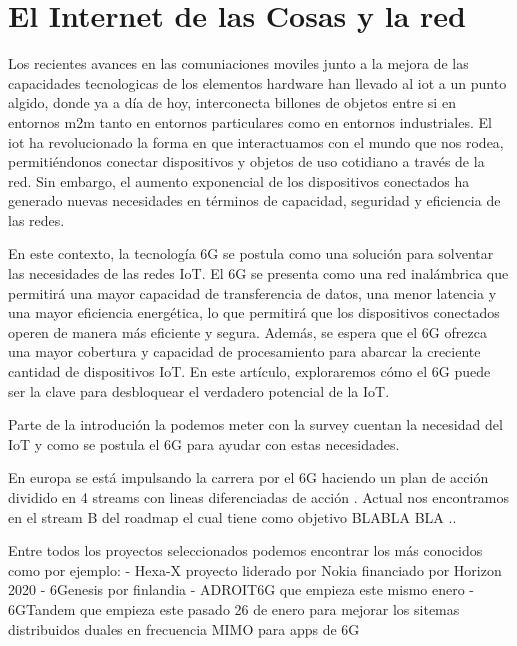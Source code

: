 \section{El Internet de las Cosas y la red }
\label{sec:6gIoT}

Los recientes avances en las comuniaciones moviles junto a la mejora de las capacidades tecnologicas de los elementos hardware han llevado al \gls{iot} a un punto algido, donde ya a día de hoy, interconecta billones de objetos entre si en entornos \gls{m2m} tanto en entornos particulares como en entornos industriales. El \gls{iot} ha revolucionado la forma en que interactuamos con el mundo que nos rodea, permitiéndonos conectar dispositivos y objetos de uso cotidiano a través de la red. Sin embargo, el aumento exponencial de los dispositivos conectados ha generado nuevas necesidades en términos de capacidad, seguridad y eficiencia de las redes.



En este contexto, la tecnología 6G se postula como una solución para solventar las necesidades de las redes IoT. El 6G se presenta como una red inalámbrica que permitirá una mayor capacidad de transferencia de datos, una menor latencia y una mayor eficiencia energética, lo que permitirá que los dispositivos conectados operen de manera más eficiente y segura. Además, se espera que el 6G ofrezca una mayor cobertura y capacidad de procesamiento para abarcar la creciente cantidad de dispositivos IoT. En este artículo, exploraremos cómo el 6G puede ser la clave para desbloquear el verdadero potencial de la IoT.


Parte de la introdución la podemos meter con la survey \cite{Nguyen2022} cuentan la necesidad del IoT y como se postula el 6G para ayudar con estas necesidades.



En europa se está impulsando la carrera por el 6G haciendo un plan de acción dividido en 4 streams con lineas diferenciadas de acción \cite{eu6GFases}. Actual nos encontramos en el stream B del roadmap \cite{eu6GFase2} el cual tiene como objetivo BLABLA BLA ..

Entre todos los proyectos seleccionados podemos encontrar los más conocidos como por ejemplo:
-   Hexa-X proyecto liderado por Nokia financiado por Horizon 2020 \cite{Uusitalo2021}
-   6Genesis por finlandia \cite{Katz2019}
-   ADROIT6G que empieza este mismo enero \cite{ADROIT6G}
-   6GTandem que empieza este pasado 26 de enero para mejorar los sitemas distribuidos duales en frecuencia MIMO para apps de 6G \cite{6GTandem}

